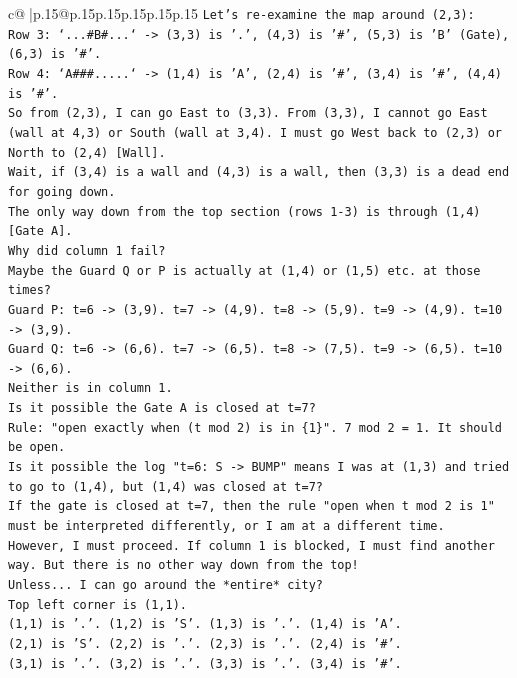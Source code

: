 \documentclass{article}
\begin{document}
{\begin{supertabular}{c@{$\;$}|p{.15\linewidth}@{}p{.15\linewidth}p{.15\linewidth}p{.15\linewidth}p{.15\linewidth}p{.15\linewidth}}
{{{\texttt{Let's re{-}examine the map around (2,3):} \\
\texttt{Row 3: `...\#B\#...` {-}> (3,3) is '.', (4,3) is '\#', (5,3) is 'B' (Gate), (6,3) is '\#'.} \\
\texttt{Row 4: `A\#\#\#.....` {-}> (1,4) is 'A', (2,4) is '\#', (3,4) is '\#', (4,4) is '\#'.} \\
\texttt{So from (2,3), I can go East to (3,3). From (3,3), I cannot go East (wall at 4,3) or South (wall at 3,4). I must go West back to (2,3) or North to (2,4) {[}Wall{]}.} \\
\texttt{Wait, if (3,4) is a wall and (4,3) is a wall, then (3,3) is a dead end for going down.} \\
\texttt{The only way down from the top section (rows 1{-}3) is through (1,4) {[}Gate A{]}.} \\
\texttt{Why did column 1 fail?} \\
\texttt{Maybe the Guard Q or P is actually at (1,4) or (1,5) etc. at those times?} \\
\texttt{Guard P: t=6 {-}> (3,9). t=7 {-}> (4,9). t=8 {-}> (5,9). t=9 {-}> (4,9). t=10 {-}> (3,9).} \\
\texttt{Guard Q: t=6 {-}> (6,6). t=7 {-}> (6,5). t=8 {-}> (7,5). t=9 {-}> (6,5). t=10 {-}> (6,6).} \\
\texttt{Neither is in column 1.} \\
\texttt{Is it possible the Gate A is closed at t=7?} \\
\texttt{Rule: "open exactly when (t mod 2) is in \{1\}". 7 mod 2 = 1. It should be open.} \\
\texttt{Is it possible the log "t=6: S {-}> BUMP" means I was at (1,3) and tried to go to (1,4), but (1,4) was closed at t=7?} \\
\texttt{If the gate is closed at t=7, then the rule "open when t mod 2 is 1" must be interpreted differently, or I am at a different time.} \\
\texttt{However, I must proceed. If column 1 is blocked, I must find another way. But there is no other way down from the top!} \\
\texttt{Unless... I can go around the *entire* city?} \\
\texttt{Top left corner is (1,1).} \\
\texttt{(1,1) is '.'. (1,2) is 'S'. (1,3) is '.'. (1,4) is 'A'.} \\
\texttt{(2,1) is 'S'. (2,2) is '.'. (2,3) is '.'. (2,4) is '\#'.} \\
\texttt{(3,1) is '.'. (3,2) is '.'. (3,3) is '.'. (3,4) is '\#'.} \\
}}}
\end{supertabular}}
\end{document}
